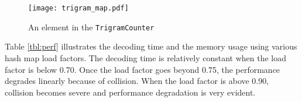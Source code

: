 \documentclass[12pt]{article}   %
\begin{document}
\begin{figure}[h*]
	\centering
	\texttt{[image: trigram\_map.pdf]}
	\caption{An element in the \texttt{TrigramCounter}}
	\label{fig:trigramcounter}
\end{figure}

Table \ref{tbl:perf} illustrates the decoding time and the memory usage using various hash map load factors. The decoding time is relatively constant when the load factor is below 0.70. Once the load factor goes beyond 0.75, the performance degrades linearly because of collision. When the load factor is above 0.90, collision becomes severe and performance degradation is very evident.
\end{document}
